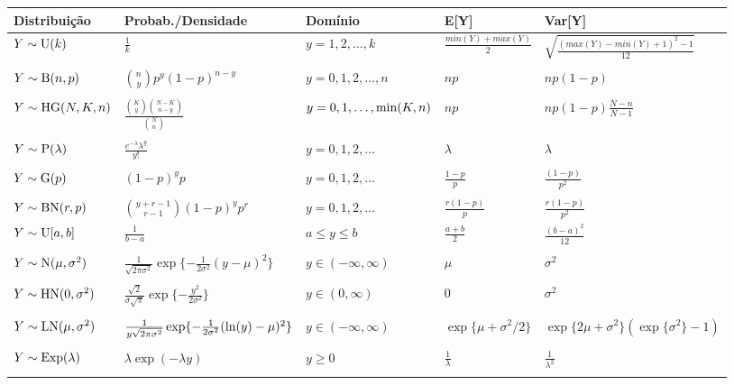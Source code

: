 \begin{tabular}{lllll} 
\hline
Distribuição & Probab./Densidade & Domínio & E[Y] & Var[Y] \\
\hline
$Y \sim {\rm U}(k)$ & $\frac{1}{k}$ & $y=1, 2, \ldots, k$  & $\frac{min(Y) + max(Y)}{2}$ & $\sqrt{\frac{(max(Y) - min(Y) + 1)^2 -1}{12}}$  \\
\\
$Y \sim {\rm B}(n,p)$ & $\binom{n}{y} p^y (1-p)^{n-y}$ & $y=0, 1, 2, \ldots, n$ 
&  $np$ & $np(1-p)$ \\
\\
$Y \sim {\rm HG}(N, K, n)$ & $\frac{\binom{K}{y}\binom{N-K}{n-y}}{\binom{N}{n}}$ &  $y=0, 1, \ldots, {\rm min}(K,n)$ & $np$ & $np(1-p)\frac{N-n}{N-1}$ \\
\\
$Y \sim {\rm P}(\lambda)$ &  $\frac{e^{-\lambda} \lambda^y}{y!}$ & $y=0, 1, 2, \ldots$ & $\lambda$ & $\lambda$ \\
\\
$Y \sim {\rm G}(p)$ &  $(1-p)^{y}p$ & $y=0, 1, 2, \ldots$
& $\frac{1-p}{p}$ & $\frac{(1-p)}{p^2}$ \\
\\
$Y \sim {\rm BN}(r,p)$ &  $\binom{y+r-1}{r-1} (1-p)^{y} p^r$ & $y=0, 1, 2, \ldots$ 
& $\frac{r(1-p)}{p}$ & $\frac{r(1-p)}{p^2}$ \\
\hline
$Y \sim {\rm U}[a,b]$ & $\frac{1}{b-a}$ & $a \leq y \leq b$ & $\frac{a+b}{2}$ & $\frac{(b-a)^2}{12}$ \\
\\
$Y \sim {\rm N}(\mu, \sigma^2)$ &  $\frac{1}{\sqrt{2\pi\sigma^2}}\exp\{-\frac{1}{2\sigma^2}(y - \mu)^2\}$ & $y \in (-\infty, \infty)$ & $\mu$ & $\sigma^2$ \\
\\
$Y \sim {\rm HN}(0, \sigma^2)$ &  $\frac{\sqrt{2}}{\sigma\sqrt{\pi}}\exp\{-\frac{y^2}{2\sigma^2}\} $ & $y \in (0, \infty)$ & $0$ & $\sigma^2$ \\
\\
$Y \sim {\rm LN}(\mu, \sigma^2)$ &  $\frac{1}{y \sqrt{2\pi\sigma^2}}\exp\{-\frac{1}{2\sigma^2}({\rm ln}(y) - \mu)^2\}$ & $y \in (-\infty, \infty)$ & $ \exp\{\mu + \sigma^2/2\}$ & $\exp\{2\mu + \sigma^2\}(\exp\{\sigma^2\} -1)$ \\
\\
$Y \sim {\rm Exp}(\lambda)$ & $ \lambda\exp(-\lambda y)$ & $y \geq 0$ & 
$ \frac{1}{\lambda}$ & $\frac{1}{\lambda^2}$ \\
\\

\end{tabular}
